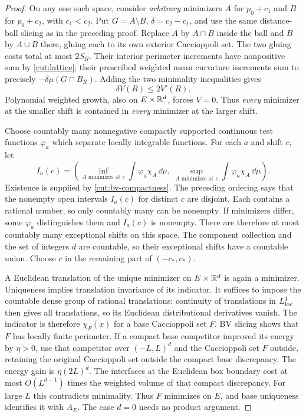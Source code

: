 \begin{proof}
On any one such space, consider \emph{arbitrary} minimizers $A$ for
$p_0+c_1$ and $B$ for $p_0+c_2$, with $c_1<c_2$.  Put
$G=A\setminus B$, $\delta=c_2-c_1$, and use the same distance-ball
slicing as in the preceding proof.  Replace $A$ by $A\cap B$ inside the
ball and $B$ by $A\cup B$ there, gluing each to its own exterior Caccioppoli set.
The two gluing costs total at most $2S_R$.  Their interior perimeter
increments have nonpositive sum by \eqref{cut:lattice}; their prescribed weighted mean curvature
increments sum to precisely $-\delta\mu(G\cap B_R)$.  Adding the two
minimality inequalities gives
\begin{equation}\label{cut:ordering-volume}
                 \delta V(R)\le2V'(R).
\end{equation}
Polynomial weighted growth, also on $E\times\mathbb R^d$, forces $V=0$.
Thus \emph{every} minimizer at the smaller shift is contained in
\emph{every} minimizer at the larger shift.

Choose countably many nonnegative compactly supported continuous test
functions $\varphi_a$ which separate locally integrable functions.
For each $a$ and shift $c$, let
\[
 I_a(c)=\left(\inf_{A\text{ minimizes at }c}
                 \int\varphi_a\chi_A\,\dd\mu,
              \ \sup_{A\text{ minimizes at }c}
                 \int\varphi_a\chi_A\,\dd\mu\right).
\]
Existence is supplied by \cref{cut:bv-compactness}.  The preceding
ordering says that the nonempty open intervals $I_a(c)$ for distinct
$c$ are disjoint.  Each contains a rational number, so only countably
many can be nonempty.  If minimizers differ, some $\varphi_a$ distinguishes
them and $I_a(c)$ is nonempty.  There are therefore at most countably
many exceptional shifts on this space.  The component collection and the
set of integers $d$ are countable, so their exceptional shifts have a
countable union.  Choose $c$ in the remaining part of $(-c_*,c_*)$.

A Euclidean translation of the unique minimizer on $E\times\mathbb R^d$ is
again a minimizer.  Uniqueness implies translation invariance of its
indicator.  It suffices to impose the countable dense group of rational
translations: continuity of translations in $L^1_{\rm loc}$ then gives
all translations, so its Euclidean distributional derivatives vanish.
The indicator is therefore $\chi_F(x)$ for a base Caccioppoli set $F$.
BV slicing shows that $F$ has locally finite perimeter.  If a compact
base competitor improved its energy by $\eta>0$, use that competitor
over $(-L,L)^d$ and the Caccioppoli set $F$ outside, retaining the original Caccioppoli set
outside the compact base discrepancy.  The energy gain is
$\eta(2L)^d$.  The interfaces at the Euclidean box boundary cost at most
$O(L^{d-1})$ times the weighted volume of that compact discrepancy.
For large $L$ this contradicts minimality.  Thus $F$ minimizes on $E$,
and base uniqueness identifies it with $A_E$.  The case $d=0$ needs
no product argument.
\end{proof}

